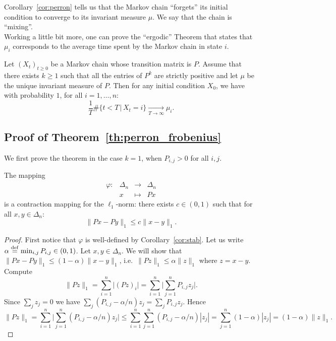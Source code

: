 \documentclass[11pt,nocut]{article}
\begin{document}
Corollary~\ref{cor:perron} tells us that the Markov chain ``forgets'' its initial condition to converge to its invariant measure $\mu$. We say that the chain is ``mixing''. 
\\

Working a little bit more, one can prove the ``ergodic'' Theorem that states that $\mu_i$ corresponds to the average time spent by the Markov chain in state $i$.

\begin{theorem}\label{th:ergodic}
	Let $(X_t)_{t \geq 0}$ be a Markov chain whose transition matrix is $P$.
	Assume that there exists $k \geq 1$ such that all the entries of $P^k$ are strictly positive and let $\mu$ be the unique invariant measure of $P$. Then for any initial condition $X_0$, we have with probability $1$, for all $i=1, \dots, n$:
	$$
	\frac{1}{T} \# \big\{ t < T \, \big| \, X_t = i \big\}
	\xrightarrow[T \to \infty]{} \mu_i.
	$$
\end{theorem}


\subsection{Proof of Theorem~\ref{th:perron_frobenius}}
We first prove the theorem in the case $k=1$, when $P_{i,j} > 0$ for all $i,j$.
\begin{lemma}\label{lem:contract}
	The mapping 
	$$
	\begin{array}{cccc}
		\varphi:& \Delta_n &\to& \Delta_n \\
				& x & \mapsto & Px
	\end{array}
	$$
	is a contraction mapping for the $\ell_1$-norm: there exists $c \in (0,1)$ such that for all $x,y \in \Delta_n$:
	$$
	\| Px - Py \|_1 \leq c \| x-y\|_1.
	$$
\end{lemma}
\begin{proof}
	First notice that $\varphi$ is well-defined by Corollary~\ref{cor:stab}.
	Let us write $\alpha \overset{\rm def}{=} \min_{i,j} P_{i,j} \in (0,1)$.
	Let $x,y \in \Delta_n$. We will show that $\| Px - Py \|_1 \leq (1-\alpha) \| x-y\|_1$, i.e.\ $\|P z\|_1 \leq \alpha \|z\|_1$ where $z = x-y$. Compute
	$$
	\| P z\|_1 
	= \sum_{i=1}^n \big| (Pz)_i \big|
	= \sum_{i=1}^n \Big| \sum_{j=1}^n P_{i,j}z_j \Big|.
	$$
	Since $\sum_{j} z_j = 0$ we have $\sum_j (P_{i,j} - \alpha/n) z_j = \sum_j P_{i,j} z_j$. Hence
	$$
	\| P z\|_1 
	= \sum_{i=1}^n \Big| \sum_{j=1}^n (P_{i,j} - \alpha/n) z_j \Big|
	\leq \sum_{i=1}^n \sum_{j=1}^n (P_{i,j} - \alpha/n) |z_j| 
	= \sum_{j=1}^n (1-\alpha) |z_j|
	= (1-\alpha) \|z\|_1.
	$$
\end{proof}
\end{document}
